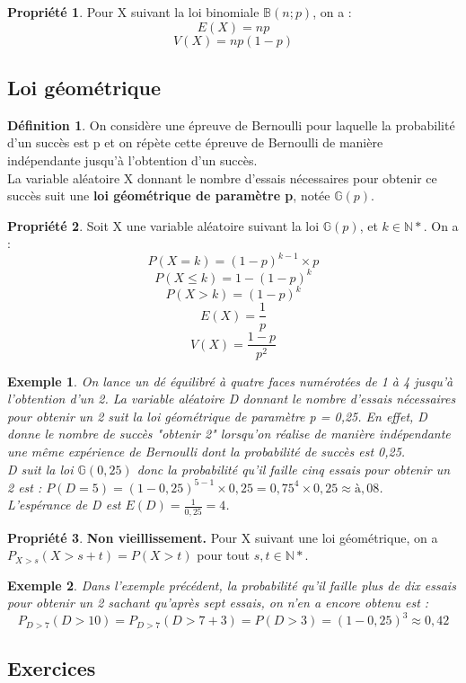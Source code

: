 \documentclass[a4paper,12pt,final]{article}
\newtheorem{Ex}{Exemple}[section]
\theoremstyle{theorem}
\theoremstyle{definition}
\newtheorem{Propriete}{Propriété}[section]
\theoremstyle{definition}
\theoremstyle{definition}
\newtheorem{Def}{Définition}[section]
\begin{document}
	\begin{Propriete}
		Pour X suivant la loi binomiale $\mathbb{B} (n;p)$, on a : 
		\[E(X) = np\]
		\[V(X) = np(1-p)\]
	\end{Propriete}

	\subsection{Loi géométrique}
	
	\begin{Def}
		On considère une épreuve de Bernoulli pour laquelle la probabilité d'un succès est p et on répète cette épreuve de Bernoulli de manière indépendante jusqu'à l'obtention d'un succès. \\
		La variable aléatoire X donnant le nombre d'essais nécessaires pour obtenir ce succès suit une \textbf{loi géométrique de paramètre p}, notée $\mathbb{G} (p)$.
	\end{Def}

	\begin{Propriete}
		Soit X une variable aléatoire suivant la loi $\mathbb{G} (p)$, et $k \in \mathbb{N}*$. On a : 
		\[P(X=k) = (1-p)^{k-1} \times p \] 
		\[P(X \leq k) = 1 - (1-p)^{k}\]
		\[P(X>k) = (1-p)^{k}\]
		\[E(X) = \frac{1}{p}\]
		\[V(X) = \frac{1-p}{p^{2}}\]
	\end{Propriete}

	\begin{Ex}
		On lance un dé équilibré à quatre faces numérotées de 1 à 4 jusqu'à l'obtention d'un 2. La variable aléatoire D donnant le nombre d'essais nécessaires pour obtenir un 2 suit la loi géométrique de paramètre p = 0,25. En effet, D donne le nombre de succès "obtenir 2" lorsqu'on réalise de manière indépendante une même expérience de Bernoulli dont la probabilité de succès est 0,25. \\
		D suit la loi $\mathbb{G} (0,25)$ donc la probabilité qu'il faille cinq essais pour obtenir un 2 est : $P(D = 5) = (1-0,25)^{5-1} \times 0,25 = 0,75^{4} \times 0,25 \approx à,08$. \\
		L'espérance de D est $E(D) = \frac{1}{0,25} = 4$.
		
	\end{Ex}

	\begin{Propriete}
		\textbf{Non vieillissement.} Pour X suivant une loi géométrique, on a $P_{X>s}(X>s+t) = P(X>t)$ pour tout $s,t\in \mathbb{N}*$.\\
	\end{Propriete}

	\begin{Ex}
		Dans l'exemple précédent, la probabilité qu'il faille plus de dix essais pour obtenir un 2 sachant qu'après sept essais, on n'en a encore obtenu est : 
		\[P_{D>7}(D>10) = P_{D>7}(D>7+3) = P(D>3) = (1-0,25)^{3} \approx 0,42\]
	\end{Ex}

	\subsection{Exercices}
	
\end{document}
